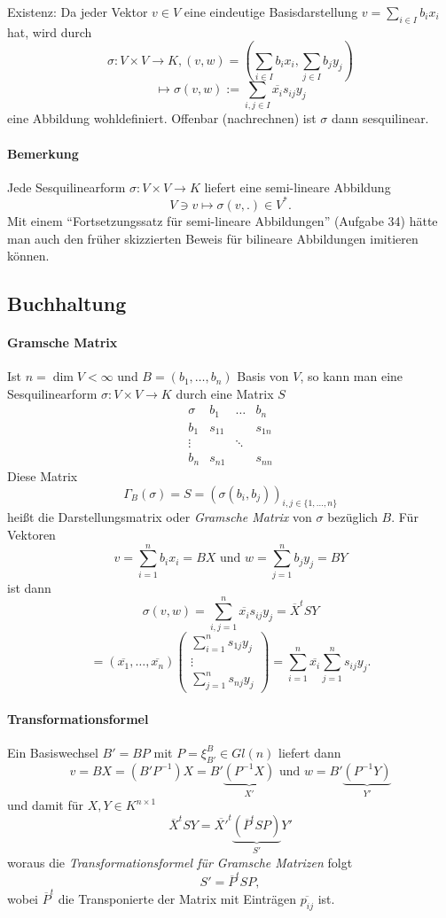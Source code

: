 	{Existenz:}
	Da jeder Vektor $ v\in V $ eine eindeutige Basisdarstellung $ v=\sum_{i\in I}b_ix_i $ hat, wird durch
	\[ \sigma:V\times V \to K, (v,w)= \left(\sum_{i\in I}b_ix_i, \sum_{j\in I}b_jy_j\right) \]
	\[ \mapsto \sigma(v,w) := \sum_{i,j\in I}\overline{x_i}s_{ij}y_j \]
	eine Abbildung wohldefiniert. Offenbar (nachrechnen) ist $ \sigma $ dann sesquilinear. 

\paragraph{Bemerkung}
	Jede Sesquilinearform $ \sigma: V\times V\to K $ liefert eine semi-lineare Abbildung
		\[ V\ni v\mapsto \sigma(v,.)\in V^*. \]
	Mit einem "`Fortsetzungssatz für semi-lineare Abbildungen"' (Aufgabe 34) hätte man auch den früher skizzierten Beweis für bilineare Abbildungen imitieren können.

\subsection{Buchhaltung}
\paragraph{Gramsche Matrix}
	Ist $ n=\dim V < \infty $ und $ B=(b_1,\dots,b_n) $ Basis von $ V $, so kann man eine Sesquilinearform $ \sigma: V\times V\to K $ durch eine Matrix $ S $
	\[ \begin{array}{c|ccc}
	\sigma & b_1 & \dots & b_n \\ \hline
	b_1 & s_{11} &  & s_{1n} \\ 
	\vdots &  & \ddots &  \\ 
	b_n & s_{n1} &  & s_{nn}
	\end{array}  \]
	Diese Matrix
		\[ \Gamma_B(\sigma) = S = \left(\sigma(b_i,b_j)\right)_{i,j\in \{1,\dots,n\}} \]
	heißt die Darstellungsmatrix oder \emph{Gramsche Matrix} von $ \sigma $ bezüglich $ B $. Für Vektoren
		\[ v = \sum_{i=1}^{n}b_ix_i = BX \text{ und } w = \sum_{j=1}^{n}b_jy_j = BY \]
	ist dann
		\[ \sigma(v,w) = \sum_{i,j=1}^{n}\overline{x_i}s_{ij}y_j = \overline{X}^tSY \]
		\[ = (\overline{x_1},\dots,\overline{x_n})\begin{pmatrix}
		\sum_{i=1}^{n}s_{1j}y_j\\ \vdots\\ \sum_{j=1}^{n}s_{nj}y_j
		\end{pmatrix} = \sum_{i=1}^{n}\overline{x_i}\sum_{j=1}^{n}s_{ij}y_j. \]
\paragraph{Transformationsformel}
	Ein Basiswechsel $ B' = BP $ mit $ P = \xi_{B'}^B \in Gl(n)$ liefert dann
		\[ v = BX = (B'P^{-1})X = B'\underset{X'}{\underbrace{(P^{-1}X)}} \text{ und } w = B'\underset{Y'}{\underbrace{(P^{-1}Y)}} \]
	und damit für $ X,Y \in K^{n\times 1} $
		\[ \overline{X}^tSY = \overline{X'}^t\underset{S'}{\underbrace{(\overline{P}^tSP)}}Y' \]
	woraus die \emph{Transformationsformel für Gramsche Matrizen} folgt
		\[ S' = \overline{P}^tSP, \]
	wobei $ \overline{P}^t $ die Transponierte der Matrix mit Einträgen $ \overline{p_{ij}} $ ist.

